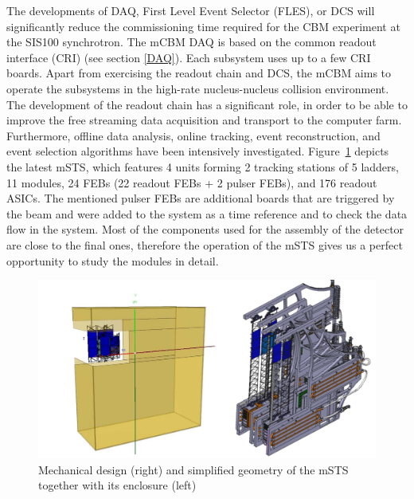 The developments of DAQ, First Level Event Selector (\gls{FLES}), or \gls{DCS} will significantly reduce the commissioning time required for the CBM experiment at the SIS100 synchrotron. The mCBM \gls{DAQ} is based on the common readout interface (\gls{CRI}) (see section \ref{DAQ}). Each subsystem uses up to a few \gls{CRI} boards. Apart from exercising the readout chain and \gls{DCS}, the mCBM aims to operate the subsystems in the high-rate nucleus-nucleus collision environment. The development of the readout chain has a significant role, in order to be able to improve the free streaming data acquisition and transport to the computer farm. Furthermore, offline data analysis, online tracking, event reconstruction, and event selection algorithms have been intensively investigated. 
\newpage
Figure~\ref{fig_STS} depicts the latest \gls{mSTS}, which features 4 units forming 2 tracking stations of 5 ladders, 11 modules, 24 \gls{FEB}s (22 readout \gls{FEB}s + 2 pulser \gls{FEB}s), and 176 readout \gls{ASIC}s. The mentioned pulser \gls{FEB}s are additional boards that are triggered by the beam and were added to the system as a time reference and to check the data flow in the system.  Most of the components used for the assembly of the detector are close to the final ones, therefore the operation of the \gls{mSTS} gives us a perfect opportunity to study the modules in detail.
\begin{figure}[!h]
\centering
\includegraphics[width=0.75\columnwidth]{Chapter6/DCS/images/mSTS_mech.png}
\caption{Mechanical design (right) and simplified geometry of the \gls{mSTS} together with its enclosure (left)}
\label{fig_STS}
\end{figure}


